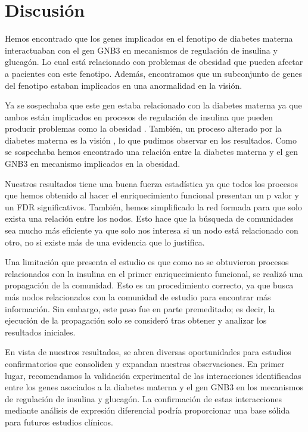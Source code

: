 \section{Discusión}
Hemos encontrado que los genes implicados en el fenotipo de diabetes materna interactuaban con el gen GNB3 en mecanismos de regulación de insulina y glucagón. Lo cual está relacionado con problemas de obesidad que pueden afectar a pacientes con este fenotipo. Además, encontramos que un subconjunto de genes del fenotipo estaban implicados en una anormalidad en la visión.

Ya se sospechaba que este gen estaba relacionado con la diabetes materna \cite{Feng2019} ya que ambos están implicados en procesos de regulación de insulina \cite{Rodolaki2023, Feng2019} que pueden producir problemas como la obesidad \cite{Shah2011}. También, un proceso alterado por la diabetes materna es la visión \cite{Nelson1986}, lo que pudimos observar en los resultados. Como se sospechaba hemos encontrado una relación entre la diabetes materna y el gen GNB3 en mecanismo implicados en la obesidad.

Nuestros resultados tiene una buena fuerza estadística ya que todos los procesos que hemos obtenido al hacer el enriquecimiento funcional presentan un p valor y un FDR significativos. También, hemos simplificado la red formada para que solo exista una relación entre los nodos. Esto hace que la búsqueda de comunidades sea mucho más eficiente ya que solo nos interesa si un nodo está relacionado con otro, no si existe más de una evidencia que lo justifica.

Una limitación que presenta el estudio es que como no se obtuvieron procesos relacionados con la insulina en el primer enriquecimiento funcional, se realizó una propagación de la comunidad. Esto es un procedimiento correcto, ya que busca más nodos relacionados con la comunidad de estudio para encontrar más información. Sin embargo, este paso fue en parte premeditado; es decir, la ejecución de la propagación solo se consideró tras obtener y analizar los resultados iniciales.

En vista de nuestros resultados, se abren diversas oportunidades para estudios confirmatorios que consoliden y expandan nuestras observaciones. En primer lugar, recomendamos la validación experimental de las interacciones identificadas entre los genes asociados a la diabetes materna y el gen GNB3 en los mecanismos de regulación de insulina y glucagón. La confirmación de estas interacciones mediante análisis de expresión diferencial\cite{Haynes2013} podría proporcionar una base sólida para futuros estudios clínicos.

